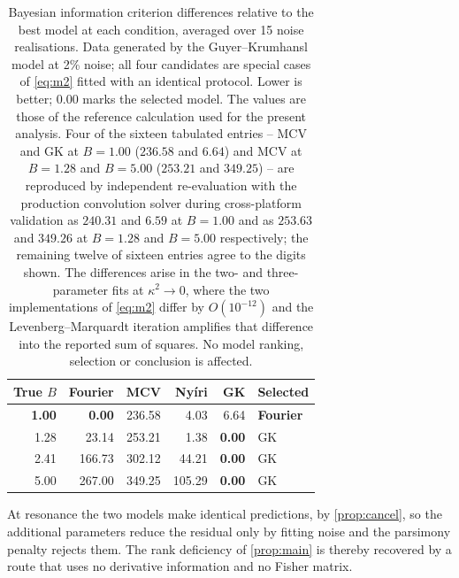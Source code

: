 \documentclass[preprint,12pt,a4paper]{elsarticle}
\theoremstyle{plain}
\theoremstyle{definition}
\theoremstyle{remark}
\newcommand{\kk}{\kappa^{2}}
\newcommand{\Bnum}{B}
\begin{document}
\begin{table}[htbp]
  \centering
  \caption{Bayesian information criterion differences relative to the best
           model at each condition, averaged over 15 noise realisations. Data
           generated by the Guyer--Krumhansl model at 2\% noise; all four
           candidates are special cases of \eqref{eq:m2} fitted with an
           identical protocol. Lower is better; $0.00$ marks the selected
           model. The values are those of the reference calculation used for the present analysis.
           Four of the sixteen tabulated entries -- MCV and GK at
           $\Bnum=1.00$ ($236.58$ and $6.64$) and MCV at $\Bnum=1.28$ and
           $\Bnum=5.00$ ($253.21$ and $349.25$) -- are reproduced by
           independent re-evaluation with the production convolution solver
           during cross-platform validation as $240.31$ and $6.59$ at
           $\Bnum=1.00$ and as $253.63$ and $349.26$ at $\Bnum=1.28$ and
           $\Bnum=5.00$ respectively; the remaining twelve of sixteen entries
           agree to the digits shown. The differences arise in the two- and
           three-parameter fits at $\kk\to0$, where the two implementations of
           \eqref{eq:m2} differ by $O(10^{-12})$ and the
           Levenberg--Marquardt iteration amplifies that difference into the
           reported sum of squares. No model ranking, selection or conclusion
           is affected.}
  \label{tab:bic}
  \small
  \begin{tabular}{@{}rrrrrl@{}}
    \toprule
    \textbf{True} $\Bnum$ & \textbf{Fourier} & \textbf{MCV} &
    \textbf{Nyíri} & \textbf{GK} & \textbf{Selected} \\
    \midrule
    \textbf{1.00} & \textbf{0.00} & 236.58 & 4.03 & 6.64 & \textbf{Fourier} \\
    1.28 & 23.14  & 253.21 & 1.38   & \textbf{0.00} & GK \\
    2.41 & 166.73 & 302.12 & 44.21  & \textbf{0.00} & GK \\
    5.00 & 267.00 & 349.25 & 105.29 & \textbf{0.00} & GK \\
    \bottomrule
  \end{tabular}
\end{table}
 At resonance the two models make identical predictions, by
\cref{prop:cancel}, so the additional parameters reduce the residual only by
fitting noise and the parsimony penalty rejects them. The rank deficiency of
\cref{prop:main} is thereby recovered by a route that uses no derivative
information and no Fisher matrix.
\end{document}
